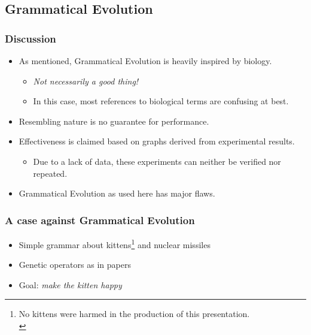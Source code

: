 \documentclass{beamer}
\begin{document}
\subsection{Grammatical Evolution}
\begin{frame}
\frametitle{Discussion}
\begin{itemize}
	\item As mentioned, Grammatical Evolution is heavily inspired by biology.
	\begin{itemize}
		\item \textit{Not necessarily a good thing!}
		\item In this case, most references to biological terms are confusing at best.
	\end{itemize}
	\item Resembling nature is no guarantee for performance.
\end{itemize}

\begin{itemize}
	\item Effectiveness is claimed based on graphs derived from experimental results.
	\begin{itemize}
		\item Due to a lack of data, these experiments can neither be verified nor repeated.
	\end{itemize}
	\item Grammatical Evolution as used here has major flaws.
\end{itemize}
\end{frame}

\begin{frame}
\frametitle{A case against Grammatical Evolution}
\begin{itemize}
\item Simple grammar about kittens\footnote{No kittens were harmed in the production of this presentation.\\} and nuclear missiles
\item Genetic operators as in papers
\item Goal: \textit{make the kitten happy}
\end{itemize}
\end{frame}
\end{document}
